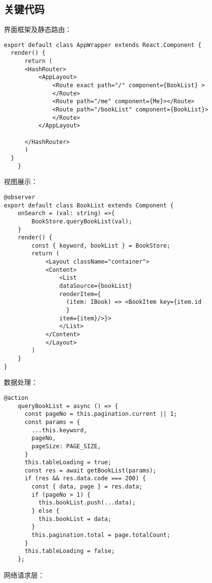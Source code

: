 \subsection{关键代码}
界面框架及静态路由：

\begin{lstlisting}[numberstyle=\tiny,keywordstyle=\color{blue!70},
    commentstyle=\color{red!50!green!50!blue!50},frame=shadowbox,
    rulesepcolor=\color{red!20!green!20!blue!20},basicstyle=\ttfamily]
export default class AppWrapper extends React.Component {
  render() {
      return (
      <HashRouter>
          <AppLayout>
              <Route exact path="/" component={BookList} >
              </Route>
              <Route path="/me" component={Me}></Route>
              <Route path="/bookList" component={BookList}>
              </Route>
          </AppLayout>
          
      </HashRouter>
      )
  }
    }    
\end{lstlisting}
视图展示：

\begin{lstlisting}[numberstyle=\tiny,keywordstyle=\color{blue!70},
    commentstyle=\color{red!50!green!50!blue!50},frame=shadowbox,
    rulesepcolor=\color{red!20!green!20!blue!20},basicstyle=\ttfamily]
    @observer
export default class BookList extends Component {
    onSearch = (val: string) =>{
        BookStore.queryBookList(val);
    }
    render() {
        const { keyword, bookList } = BookStore;
        return (
            <Layout className="container">
            <Content>
                <List
                dataSource={bookList}
                renderItem={
                  (item: IBook) => <BookItem key={item.id
                  }
                item={item}/>}>
                </List> 
            </Content>         
            </Layout>
        )
    }
}
\end{lstlisting}
数据处理：

\begin{lstlisting}[numberstyle=\tiny,keywordstyle=\color{blue!70},
    commentstyle=\color{red!50!green!50!blue!50},frame=shadowbox,
    rulesepcolor=\color{red!20!green!20!blue!20},basicstyle=\ttfamily]
    @action
    queryBookList = async () => {
      const pageNo = this.pagination.current || 1;
      const params = {
        ...this.keyword,
        pageNo,
        pageSize: PAGE_SIZE,
      }
      this.tableLoading = true;
      const res = await getBookList(params);
      if (res && res.data.code === 200) {
        const { data, page } = res.data;
        if (pageNo > 1) {
          this.bookList.push(...data);
        } else {
          this.bookList = data;
        }
        this.pagination.total = page.totalCount;
      }
      this.tableLoading = false;
    };
\end{lstlisting}
网络请求层：

